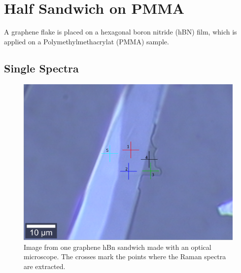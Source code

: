 \documentclass[12pt,a4paper]{article}
\begin{document}
\section{Half Sandwich on PMMA}
A graphene flake is placed on a hexagonal boron nitride (hBN) film, which is applied on a Polymethylmethacrylat (PMMA) sample. 

\subsection{Single Spectra}

\begin{figure}
\centering
\includegraphics[scale=0.25]{Bilder/Part_2/4_Half_sandwich_on_PMMA.PNG}
\caption{Image from one graphene hBn sandwich made with an optical microscope. The crosses mark the points where the Raman spectra are extracted.}
\label{fig:Part2_map_microscope}
\end{figure}
\end{document}
